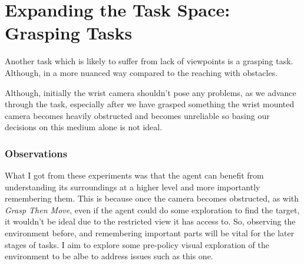\section{Expanding the Task Space: Grasping Tasks}
Another task which is likely to suffer from lack of viewpoints is a grasping task. Although, in a more nuanced way compared to the reaching with obstacles. 


Although, initially the wrist camera shouldn't pose any problems, as we advance through the task, especially after we have grasped something the wrist mounted camera becomes heavily obstructed and becomes unreliable so basing our decisions on this medium alone is not ideal.

\subsubsection{Observations}
What I got from these experiments was that the agent can benefit from understanding its surroundings at a higher level and more importantly remembering them. This is because once the camera becomes obstructed, as with \emph{Grasp Then Move}, even if the agent could do some exploration to find the target, it wouldn't be ideal due to the restricted view it has access to. So, observing the environment before, and remembering important parts will be vital for the later stages of tasks. I aim to explore some pre-policy visual exploration of the environment to be albe to address issues such as this one.

